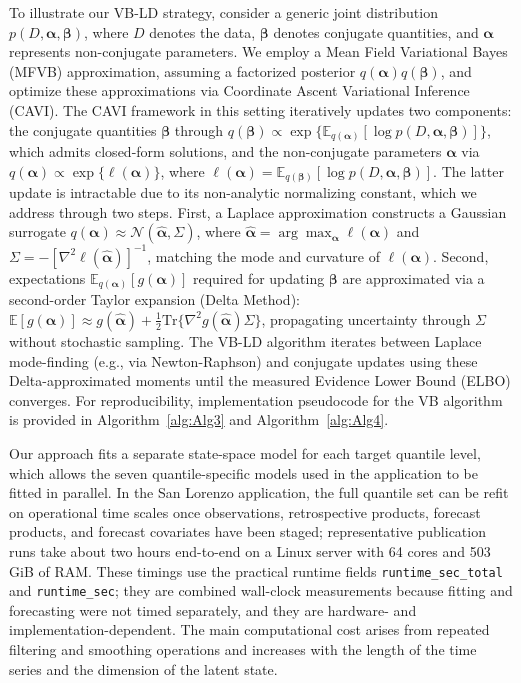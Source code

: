 \documentclass[APA,STIX1COL]{WileyNJD-v2}
\begin{document}
To illustrate our VB-LD strategy, consider a generic joint distribution \( p(D,\boldsymbol{\alpha}, \boldsymbol{\beta}) \), where \(D\) denotes the data, \(\boldsymbol{\beta}\) denotes conjugate quantities, and \(\boldsymbol{\alpha}\) represents non-conjugate parameters. We employ a Mean Field Variational Bayes (MFVB) approximation, assuming a factorized posterior \(q(\boldsymbol{\alpha})q(\boldsymbol{\beta})\), and optimize these approximations via Coordinate Ascent Variational Inference (CAVI). The CAVI framework in this setting iteratively updates two components: the conjugate quantities \(\boldsymbol{\beta}\) through \(q(\boldsymbol{\beta}) \propto \exp\{\mathbb{E}_{q(\boldsymbol{\alpha})}[\log p(D,\boldsymbol{\alpha},\boldsymbol{\beta})]\}\), which admits closed-form solutions, and the non-conjugate parameters \(\boldsymbol{\alpha}\) via \(q(\boldsymbol{\alpha}) \propto \exp\{\ell(\boldsymbol{\alpha})\}\), where \(\ell(\boldsymbol{\alpha})=\mathbb{E}_{q(\boldsymbol{\beta})}[\log p(D,\boldsymbol{\alpha},\boldsymbol{\beta})]\). The latter update is intractable due to its non-analytic normalizing constant, which we address through two steps. First, a Laplace approximation constructs a Gaussian surrogate \(q(\boldsymbol{\alpha}) \approx \mathcal{N}(\hat{\boldsymbol{\alpha}},\Sigma)\), where \(\hat{\boldsymbol{\alpha}}=\arg\max_{\boldsymbol{\alpha}}\ell(\boldsymbol{\alpha})\) and \(\Sigma=-[\nabla^2\ell(\hat{\boldsymbol{\alpha}})]^{-1}\), matching the mode and curvature of \(\ell(\boldsymbol{\alpha})\). Second, expectations \(\mathbb{E}_{q(\boldsymbol{\alpha})}[g(\boldsymbol{\alpha})]\) required for updating \(\boldsymbol{\beta}\) are approximated via a second-order Taylor expansion (Delta Method): \(\mathbb{E}[g(\boldsymbol{\alpha})]\approx g(\hat{\boldsymbol{\alpha}})+\frac{1}{2}\text{Tr}\{\nabla^2 g(\hat{\boldsymbol{\alpha}})\Sigma\}\), propagating uncertainty through \(\Sigma\) without stochastic sampling. The VB-LD algorithm iterates between Laplace mode-finding (e.g., via Newton-Raphson) and conjugate updates using these Delta-approximated moments until the measured Evidence Lower Bound (ELBO) converges.
For reproducibility, implementation pseudocode for the VB algorithm is provided in Algorithm~\ref{alg:Alg3} and Algorithm~\ref{alg:Alg4}.

Our approach fits a separate state-space model for each target quantile level, which allows the seven quantile-specific models used in the application to be fitted in parallel. In the San Lorenzo application, the full quantile set can be refit on operational time scales once observations, retrospective products, forecast products, and forecast covariates have been staged; representative publication runs take about two hours end-to-end on a Linux server with 64 cores and 503 GiB of RAM. These timings use the practical runtime fields \texttt{runtime\_sec\_total} and \texttt{runtime\_sec}; they are combined wall-clock measurements because fitting and forecasting were not timed separately, and they are hardware- and implementation-dependent. The main computational cost arises from repeated filtering and smoothing operations and increases with the length of the time series and the dimension of the latent state.
\end{document}
